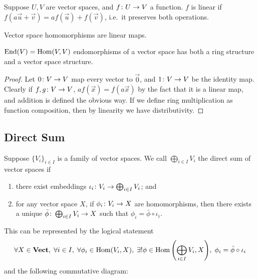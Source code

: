 \begin{definition}
    Suppose \(U,V\) are vector spaces, and \(f\colon U\to V\) a function.
    \(f\) is linear if \(f(a\vec{u}+\vec{v}) = af(\vec{u}) + f(\vec{v})\),
    i.e.\ it preserves both operations.
\end{definition}
\begin{definition}
    Vector space homomorphisms are linear maps.
\end{definition}
\begin{proposition}
    \(\operatorname{End}(V) = \operatorname{Hom}(V,V)\) endomorphisms of a vector space
    has both a ring structure and a vector space structure.
\end{proposition}
\begin{proof}
    Let \(0\colon V\to V\) map every vector to \(\vec{0}\),
    and \(1\colon V\to V\) be the identity map.
    Clearly if \(f,g\colon V\to V\),
    \(af(\vec{x}) = f(a\vec{x})\) by the fact that it is a linear map,
    and addition is defined the obvious way.
    If we define ring multiplication as function composition,
    then by linearity we have distributivity.
\end{proof}


\subsection{Direct Sum}

\begin{definition}
    Suppose \({\{V_i\}}_{i \in I}\) is a family of vector spaces.
    We call \(\bigoplus_{i \in I} V_i\) the direct sum of vector spaces if
    \begin{enumerate}[label={(\roman*)}, itemsep=0mm]
        \item there exist embeddings \(\iota_i\colon V_i\to\bigoplus_{i \in I} V_i\); and
        \item for any vector space \(X\),
            if \(\phi_i\colon V_i\to X\) are homomorphisms,
            then there exists a unique \(\bar{\phi}\colon\bigoplus_{i \in I} V_i\to X\)
            such that \(\phi_i = \bar{\phi}\circ\iota_i\).
    \end{enumerate}

    This can be represented by the logical statement
    \begin{equation*}
        \forall X\in\mathbf{Vect},\;
        \forall i \in I,\; \forall \phi_i\in\operatorname{Hom}(V_i,X),\;
        \exists! \phi\in\operatorname{Hom}\qty(\bigoplus_{i \in I} V_i,X),\;
        \phi_i = \bar{\phi}\circ\iota_i
    \end{equation*}
    and the following commutative diagram:
    \begin{center}
    \end{center}
\end{definition}

